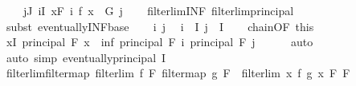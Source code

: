 \begin{isabellebody}
\ \ \ \ {\isacharparenleft}{\kern0pt}{\isasymforall}j{\isasymin}J{\isachardot}{\kern0pt}\ {\isasymexists}i{\isasymin}I{\isachardot}{\kern0pt}\ {\isasymforall}x{\isasymin}F\ i{\isachardot}{\kern0pt}\ f\ x\ {\isasymin}\ G\ j{\isacharparenright}{\kern0pt}{\isachardoublequoteclose}\isanewline
%
\isadelimproof
\ \ %
\endisadelimproof
%
\isatagproof
{}\isamarkupfalse%
\ filterlim{\isacharunderscore}{\kern0pt}INF\ filterlim{\isacharunderscore}{\kern0pt}principal\isanewline
{}\isamarkupfalse%
\ {\isacharparenleft}{\kern0pt}subst\ eventually{\isacharunderscore}{\kern0pt}INF{\isacharunderscore}{\kern0pt}base{\isacharparenright}{\kern0pt}\isanewline
\ \ \isamarkupfalse%
\ i\ j\ \isamarkupfalse%
\ {\isachardoublequoteopen}i\ {\isasymin}\ I{\isachardoublequoteclose}\ {\isachardoublequoteopen}j\ {\isasymin}\ I{\isachardoublequoteclose}\isanewline
\ \ \isamarkupfalse%
\ chain{\isacharbrackleft}{\kern0pt}OF\ this{\isacharbrackright}{\kern0pt}\ \isamarkupfalse%
\ {\isachardoublequoteopen}{\isasymexists}x{\isasymin}I{\isachardot}{\kern0pt}\ principal\ {\isacharparenleft}{\kern0pt}F\ x{\isacharparenright}{\kern0pt}\ {\isasymle}\ inf\ {\isacharparenleft}{\kern0pt}principal\ {\isacharparenleft}{\kern0pt}F\ i{\isacharparenright}{\kern0pt}{\isacharparenright}{\kern0pt}\ {\isacharparenleft}{\kern0pt}principal\ {\isacharparenleft}{\kern0pt}F\ j{\isacharparenright}{\kern0pt}{\isacharparenright}{\kern0pt}{\isachardoublequoteclose}\isanewline
\ \ \ \ \isamarkupfalse%
\ auto\isanewline
{}\isamarkupfalse%
\ {\isacharparenleft}{\kern0pt}auto\ simp{\isacharcolon}{\kern0pt}\ eventually{\isacharunderscore}{\kern0pt}principal\ {\isacartoucheopen}I\ {\isasymnoteq}\ {\isacharbraceleft}{\kern0pt}{\isacharbraceright}{\kern0pt}{\isacartoucheclose}{\isacharparenright}{\kern0pt}%
\endisatagproof
{\isafoldproof}%
%
\isadelimproof
\isanewline
%
\endisadelimproof
\isanewline
{}\isamarkupfalse%
\ filterlim{\isacharunderscore}{\kern0pt}filtermap{\isacharcolon}{\kern0pt}\ {\isachardoublequoteopen}filterlim\ f\ F{}\ {\isacharparenleft}{\kern0pt}filtermap\ g\ F{}{\isacharparenright}{\kern0pt}\ {\isacharequal}{\kern0pt}\ filterlim\ {\isacharparenleft}{\kern0pt}{\isasymlambda}x{\isachardot}{\kern0pt}\ f\ {\isacharparenleft}{\kern0pt}g\ x{\isacharparenright}{\kern0pt}{\isacharparenright}{\kern0pt}\ F{}\ F{}{\isachardoublequoteclose}\isanewline
%
\isadelimproof
\ \ %
\endisadelimproof
%
\isatagproof
{}\isamarkupfalse%

\end{isabellebody}
